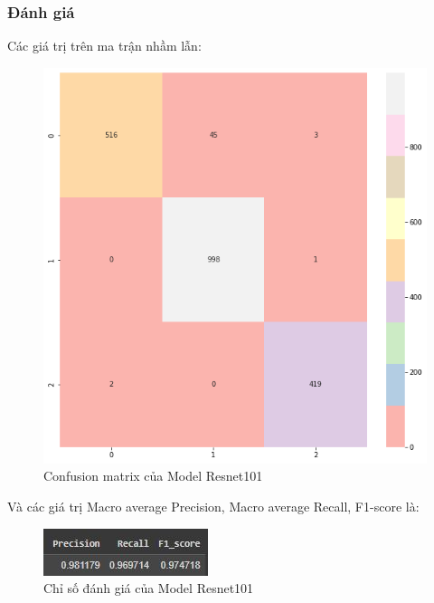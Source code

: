 \subsubsection{Đánh giá}
Các giá trị trên ma trận nhầm lẫn:
\begin{center}
    \begin{figure}[!h]
        \centering
        \includegraphics[scale = 0.35]{fileanh/39.png}
        \caption{Confusion matrix của Model Resnet101}
    \end{figure}
\end{center}
Và các giá trị Macro average Precision, Macro average Recall, F1-score là:
\begin{center}
    \begin{figure}[!h]
        \centering
        \includegraphics[scale = 2]{fileanh/40.jpg}
        \caption{Chỉ số đánh giá của Model Resnet101}
    \end{figure}
\end{center}

    
